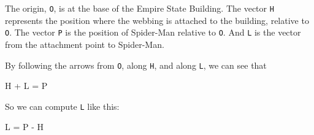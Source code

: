 The origin, \lstinline{O}, is at the base of the Empire State Building. The
vector \lstinline{H} represents the position where the webbing is attached
to the building, relative to \lstinline{O}. The vector \lstinline{P} is the
position of Spider-Man relative to \lstinline{O}. And \lstinline{L} is the
vector from the attachment point to Spider-Man.


By following the arrows from \lstinline{O}, along \lstinline{H}, and along
\lstinline{L}, we can see that

\begin{code}
H + L = P
\end{code}

So we can compute \lstinline{L} like this:

\begin{code}
L = P - H
\end{code}


